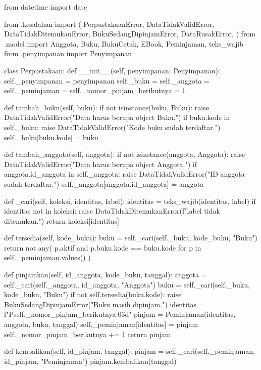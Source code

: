 \begin{kode}
from datetime import date

from .kesalahan import (
    PerpustakaanError, DataTidakValidError, DataTidakDitemukanError,
    BukuSedangDipinjamError, DataRusakError,
)
from .model import Anggota, Buku, BukuCetak, EBook, Peminjaman, teks_wajib
from .penyimpanan import Penyimpanan


class Perpustakaan:
    def __init__(self, penyimpanan: Penyimpanan):
        self._penyimpanan = penyimpanan
        self._buku = {}
        self._anggota = {}
        self._peminjaman = {}
        self._nomor_pinjam_berikutnya = 1

    def tambah_buku(self, buku):
        if not isinstance(buku, Buku):
            raise DataTidakValidError("Data harus berupa object Buku.")
        if buku.kode in self._buku:
            raise DataTidakValidError("Kode buku sudah terdaftar.")
        self._buku[buku.kode] = buku

    def tambah_anggota(self, anggota):
        if not isinstance(anggota, Anggota):
            raise DataTidakValidError("Data harus berupa object Anggota.")
        if anggota.id_anggota in self._anggota:
            raise DataTidakValidError("ID anggota sudah terdaftar.")
        self._anggota[anggota.id_anggota] = anggota

    def _cari(self, koleksi, identitas, label):
        identitas = teks_wajib(identitas, label)
        if identitas not in koleksi:
            raise DataTidakDitemukanError(f"{label} tidak ditemukan.")
        return koleksi[identitas]

    def tersedia(self, kode_buku):
        buku = self._cari(self._buku, kode_buku, "Buku")
        return not any(
            p.aktif and p.buku.kode == buku.kode
            for p in self._peminjaman.values()
        )

    def pinjamkan(self, id_anggota, kode_buku, tanggal):
        anggota = self._cari(self._anggota, id_anggota, "Anggota")
        buku = self._cari(self._buku, kode_buku, "Buku")
        if not self.tersedia(buku.kode):
            raise BukuSedangDipinjamError("Buku masih dipinjam.")
        identitas = f"P{self._nomor_pinjam_berikutnya:03d}"
        pinjam = Peminjaman(identitas, anggota, buku, tanggal)
        self._peminjaman[identitas] = pinjam
        self._nomor_pinjam_berikutnya += 1
        return pinjam

    def kembalikan(self, id_pinjam, tanggal):
        pinjam = self._cari(self._peminjaman, id_pinjam, "Peminjaman")
        pinjam.kembalikan(tanggal)


\end{kode}
